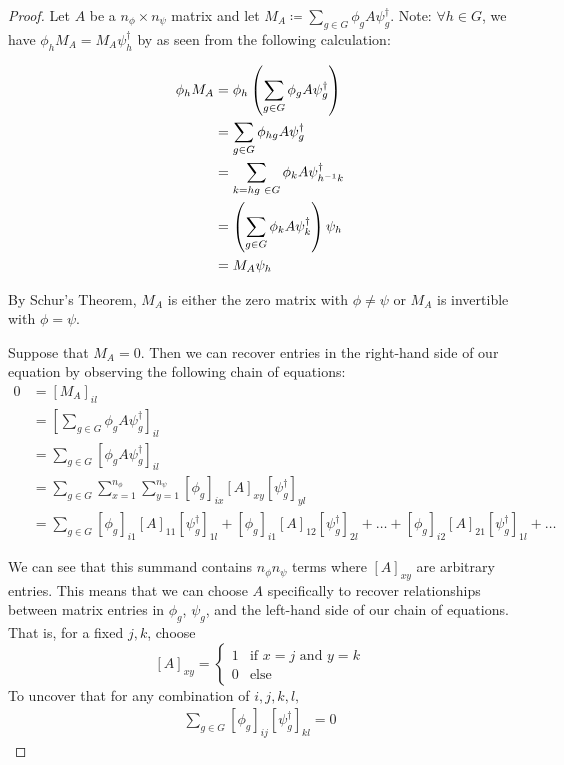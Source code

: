 \begin{proof} Let $A$ be a $n_\phi \times n_\psi$ matrix and let $M_A \coloneq \sum_{g\in G} \phi_{g} A \psi_g^{\dag}$. Note: $\forall h \in G$, we have $\phi_h M_A  = M_A \psi_h^\dag$ by as seen from the following calculation:

\begin{equation}
	\begin{aligned}
		\phi_h M_A &=  \phi_h \left(\sum_{g\in G} \phi_{g} A \psi_g^{\dag}\right) \\
				&= \sum_{g\in G} \phi_{hg} A \psi_g^{\dag} \\
				&= \sum_{k = hg \hspace{1mm} \in G} \phi_k A \psi_{h^{-1}k}^{\dag}\\
				 &= \left(\sum_{g\in G} \phi_{k} A \psi_k^{\dag} \right)\psi_h \\
				 &= M_A\psi_h 
	\end{aligned}
\end{equation}

By Schur's Theorem, $M_A$ is either the zero matrix with $\phi \neq \psi$ or $M_A$ is invertible with $\phi=\psi$. 

Suppose that $M_A = 0$. Then we can recover entries in the right-hand side of our equation by observing the following chain of equations:
\begin{equation}
	\begin{aligned}
		    0 &= \left[M_A\right]_{il} \\ 
			&= \left[\sum_{g\in G} \phi_{g} A \psi_g^{\dag}\right]_{il} \\
			&= \sum_{g\in G} \left[\phi_{g} A \psi_g^{\dag}\right]_{il} \\
			&= \sum_{g\in G} \sum_{x=1}^{n_\phi} \sum_{y=1}^{n_\psi}\left[\phi_{g}\right]_{ix} \left[A\right]_{xy} \left[\psi_g^{\dag}\right]_{yl} \\
			&= \sum_{g\in G} \left[\phi_{g}\right]_{i1} \left[A\right]_{11} \left[\psi_g^{\dag}\right]_{1l} + \left[\phi_{g}\right]_{i1} \left[A\right]_{12} \left[\psi_g^{\dag}\right]_{2l} + \hdots + \left[\phi_{g}\right]_{i2} \left[A\right]_{21} \left[\psi_g^{\dag}\right]_{1l} + \hdots
	\end{aligned}
\end{equation}

We can see that this summand contains $n_\phi n_\psi$ terms where $[A]_{xy}$ are arbitrary entries. This means that we can choose $A$ specifically to recover relationships between matrix entries in $\phi_g$, $\psi_g$, and the left-hand side of our chain of equations. That is, for a fixed $j,k$, choose $$[A]_{xy} = \begin{cases}
												1 & \text{if }x=j\text{ and } y=k \\
												0 & \text{else}
\end{cases}$$
To uncover that for any combination of $i,j,k,l,$
\begin{equation}
	\begin{aligned}
		\sum_{g\in G} \left[\phi_g\right]_{ij}\left[\psi^\dag_g\right]_{kl} = 0
	\end{aligned}
\end{equation}


\end{proof}
